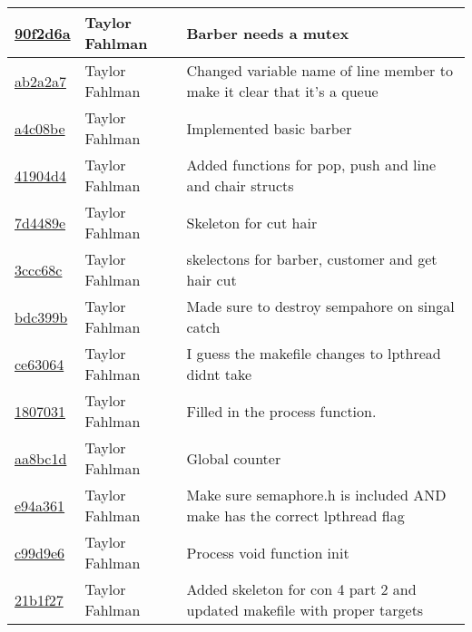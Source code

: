 \begin{tabular}{l l l}
\href{https://github.com/fahlmant/cs444/commit/90f2d6ab8135d2015943811d4ef02614540cf5b5}{90f2d6a} & Taylor Fahlman & Barber needs a mutex\\\hline
\href{https://github.com/fahlmant/cs444/commit/ab2a2a72b96398395dec1b84bc3b7a055fa4a1de}{ab2a2a7} & Taylor Fahlman & Changed variable name of line member to make it clear that it's a queue\\\hline
\href{https://github.com/fahlmant/cs444/commit/a4c08be2c2e95a6f642994c7dfceee5a3e15a24d}{a4c08be} & Taylor Fahlman & Implemented basic barber\\\hline
\href{https://github.com/fahlmant/cs444/commit/41904d4f66fa1a22a5d3c9ad3738074e08ecd403}{41904d4} & Taylor Fahlman & Added functions for pop, push and line and chair structs\\\hline
\href{https://github.com/fahlmant/cs444/commit/7d4489edc277768a6d69d3299970a30042c09132}{7d4489e} & Taylor Fahlman & Skeleton for cut hair\\\hline
\href{https://github.com/fahlmant/cs444/commit/3ccc68c59a6ae971199edd7637e54670b4e7f57d}{3ccc68c} & Taylor Fahlman & skelectons for barber, customer and get hair cut\\\hline
\href{https://github.com/fahlmant/cs444/commit/bdc399b4012b3133c3e21b19f8f6887c56361cd6}{bdc399b} & Taylor Fahlman & Made sure to destroy sempahore on singal catch\\\hline
\href{https://github.com/fahlmant/cs444/commit/ce630649ad60e39df8728526d8767082481121fc}{ce63064} & Taylor Fahlman & I guess the makefile changes to lpthread didnt take\\\hline
\href{https://github.com/fahlmant/cs444/commit/1807031905f4bea5c0570d63797c0d71708ac242}{1807031} & Taylor Fahlman & Filled in the process function.\\\hline
\href{https://github.com/fahlmant/cs444/commit/aa8bc1d7ab7203381cdd91be37573d3bdcccc3fb}{aa8bc1d} & Taylor Fahlman & Global counter\\\hline
\href{https://github.com/fahlmant/cs444/commit/e94a3616f29d2ae5b604fae19ddcafa4cf4d8c2b}{e94a361} & Taylor Fahlman & Make sure semaphore.h is included AND make has the correct lpthread flag\\\hline
\href{https://github.com/fahlmant/cs444/commit/c99d9e6fbc278647679bb6346721fd6651944a52}{c99d9e6} & Taylor Fahlman & Process void function init\\\hline
\href{https://github.com/fahlmant/cs444/commit/21b1f27262d1ee1d8ed6c3b676141c0bf500fccd}{21b1f27} & Taylor Fahlman & Added skeleton for con 4 part 2 and updated makefile with proper targets\\\hline

\end{tabular}
